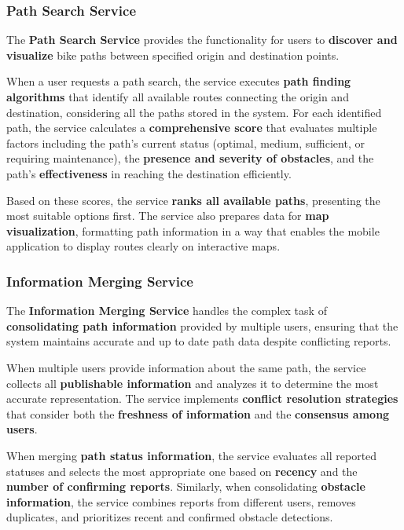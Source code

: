\subsubsection{Path Search Service}
The \textbf{Path Search Service} provides the functionality for users to \textbf{discover and visualize} bike paths between specified origin and destination points. 

When a user requests a path search, the service executes \textbf{path finding algorithms} that identify all available routes connecting the origin and destination, considering all the paths stored in the system. For each identified path, the service calculates a \textbf{comprehensive score} that evaluates multiple factors including the path's current status (optimal, medium, sufficient, or requiring maintenance), the \textbf{presence and severity of obstacles}, and the path's \textbf{effectiveness} in reaching the destination efficiently. 

Based on these scores, the service \textbf{ranks all available paths}, presenting the most suitable options first. The service also prepares data for \textbf{map visualization}, formatting path information in a way that enables the mobile application to display routes clearly on interactive maps.

\subsubsection{Information Merging Service}
The \textbf{Information Merging Service} handles the complex task of \textbf{consolidating path information} provided by multiple users, ensuring that the system maintains accurate and up to date path data despite conflicting reports. 

When multiple users provide information about the same path, the service collects all \textbf{publishable information} and analyzes it to determine the most accurate representation. The service implements \textbf{conflict resolution strategies} that consider both the \textbf{freshness of information} and the \textbf{consensus among users}. 

When merging \textbf{path status information}, the service evaluates all reported statuses and selects the most appropriate one based on \textbf{recency} and the \textbf{number of confirming reports}. Similarly, when consolidating \textbf{obstacle information}, the service combines reports from different users, removes duplicates, and prioritizes recent and confirmed obstacle detections.

